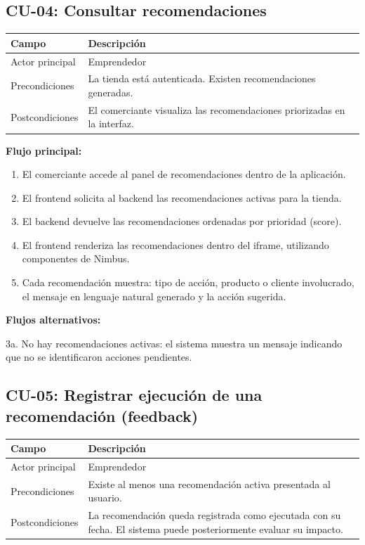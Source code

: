 \subsection{CU-04: Consultar recomendaciones}
\label{sec:cu-04}

\begin{table}[h]
\centering
\renewcommand{\arraystretch}{1.3}
\begin{tabular}{|m{3cm}|m{11.3cm}|}
\hline
\textbf{Campo} & \textbf{Descripción} \\
\hline
Actor principal & Emprendedor \\
\hline
Precondiciones & La tienda está autenticada. Existen recomendaciones generadas. \\
\hline
Postcondiciones & El comerciante visualiza las recomendaciones priorizadas en la interfaz. \\
\hline
\end{tabular}
\end{table}

\noindent\textbf{Flujo principal:}
\begin{enumerate}
    \item El comerciante accede al panel de recomendaciones dentro de la aplicación.
    \item El frontend solicita al backend las recomendaciones activas para la tienda.
    \item El backend devuelve las recomendaciones ordenadas por prioridad (score).
    \item El frontend renderiza las recomendaciones dentro del iframe, utilizando componentes de Nimbus.
    \item Cada recomendación muestra: tipo de acción, producto o cliente involucrado, el mensaje en lenguaje natural generado y la acción sugerida.
\end{enumerate}

\noindent\textbf{Flujos alternativos:}

\noindent 3a. No hay recomendaciones activas: el sistema muestra un mensaje indicando que no se identificaron acciones pendientes.

\subsection{CU-05: Registrar ejecución de una recomendación (feedback)}
\label{sec:cu-05}

\begin{table}[h]
\centering
\renewcommand{\arraystretch}{1.3}
\begin{tabular}{|m{3cm}|m{11.3cm}|}
\hline
\textbf{Campo} & \textbf{Descripción} \\
\hline
Actor principal & Emprendedor \\
\hline
Precondiciones & Existe al menos una recomendación activa presentada al usuario. \\
\hline
Postcondiciones & La recomendación queda registrada como ejecutada con su fecha. El sistema puede posteriormente evaluar su impacto. \\
\hline
\end{tabular}
\end{table}

